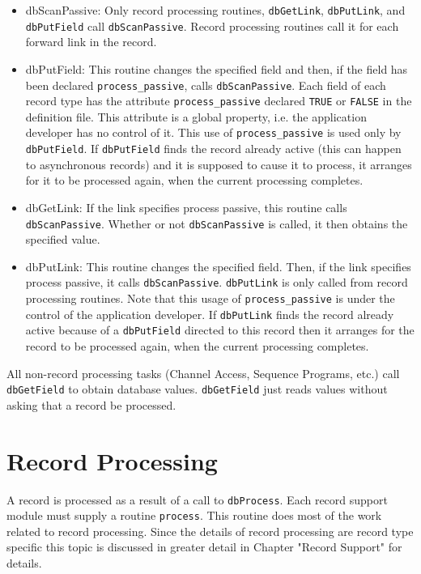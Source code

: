 \begin{itemize}\item {}dbScanPassive:  Only record processing routines, \verb|dbGetLink|, \verb|dbPutLink|, and \verb|dbPutField| call 
\verb|dbScanPassive|. Record processing routines call it for each forward link in the record. 

\item {}dbPutField:  This routine changes the specified field and then, if the field has been declared \verb|process_passive|, 
calls \verb|dbScanPassive|. Each field of each record type has the attribute \verb|process_passive| declared \verb|TRUE| or 
\verb|FALSE| in the definition file. This attribute is a global property, i.e. the application developer has no control of it. 
This use of \verb|process_passive| is used only by \verb|dbPutField|. If \verb|dbPutField| finds the record already active 
(this can happen to asynchronous records) and it is supposed to cause it to process, it arranges for it to be processed 
again, when the current processing completes.

\item {}dbGetLink:  If the link specifies process passive, this routine calls \verb|dbScanPassive|. Whether or not 
\verb|dbScanPassive| is called, it then obtains the specified value. 

\item {}dbPutLink:  This routine changes the specified field. Then, if the link specifies process passive, it calls 
\verb|dbScanPassive|. \verb|dbPutLink| is only called from record processing routines. Note that this usage of 
\verb|process_passive| is under the control of the application developer. If \verb|dbPutLink| finds the record already 
active because of a \verb|dbPutField| directed to this record then it arranges for the record to be processed again,  
when the current processing completes.

\end{itemize}All non-record processing tasks (Channel Access, Sequence Programs, etc.) call \verb|dbGetField| to obtain database values. 
\verb|dbGetField| just reads values without asking that a record be processed.

\section{Record Processing}

A record is processed as a result of a call to \verb|dbProcess|. Each record support module must supply a routine \verb|process|. 
This routine does most of the work related to record processing. Since the details of record processing are record type 
specific this topic is discussed in greater detail in Chapter "Record Support" for details.

